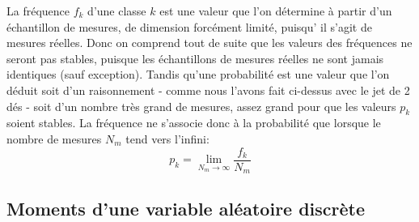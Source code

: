 La fréquence $f_k$ d'une classe $k$ est une valeur que l'on détermine à partir d'un échantillon de mesures, de dimension forcément limité, puisqu’ il s'agit de mesures réelles. Donc on comprend tout de suite que les valeurs des fréquences ne seront pas stables, puisque les échantillons de mesures réelles ne sont jamais identiques (sauf exception). Tandis qu'une probabilité est une valeur que l'on déduit soit d'un raisonnement - comme nous l'avons fait ci-dessus avec le jet de 2 dés - soit d'un nombre très grand de mesures, assez grand pour que les valeurs $p_k$ soient stables. La fréquence ne s'associe donc à la probabilité que lorsque le nombre de mesures $N_m$ tend vers l'infini:
\begin{equation}
    p_k=\lim_{N_m\rightarrow\infty}\frac{f_k}{N_m}
\end{equation}

\subsection{Moments d'une variable aléatoire discrète}\label{par:mdvad}


